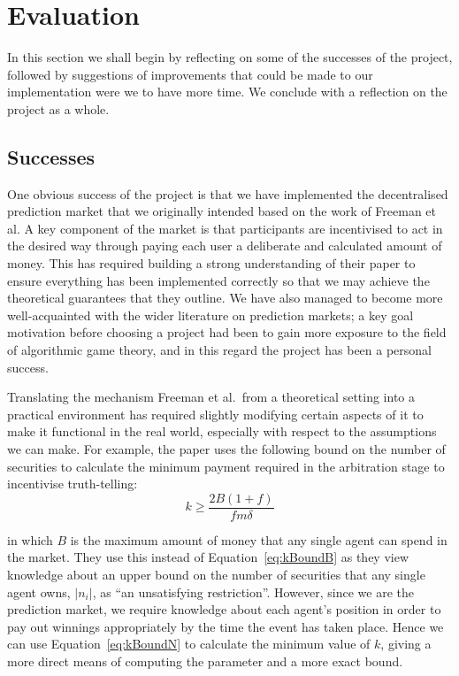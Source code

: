 \section{Evaluation}

\label{sec:evaluation}

In this section we shall begin by reflecting on some of the successes of the
project, followed by suggestions of improvements that could be made to our
implementation were we to have more time. We conclude with a reflection on the
project as a whole.

\subsection{Successes}

One obvious success of the project is that we have implemented the
decentralised prediction market that we originally intended based on the work
of Freeman et al. A key component of the market is that participants are
incentivised to act in the desired way through paying each user a deliberate
and calculated amount of money. This has required building a strong
understanding of their paper to ensure everything has been implemented
correctly so that we may achieve the theoretical guarantees that they outline.
We have also managed to become more well-acquainted with the wider literature
on prediction markets; a key goal motivation before choosing a project had been
to gain more exposure to the field of algorithmic game theory, and in this
regard the project has been a personal success.

Translating the mechanism Freeman et al.\ from a theoretical setting into a
practical environment has required slightly modifying certain aspects of it to
make it functional in the real world, especially with respect to the
assumptions we can make. For example, the paper uses the following bound on the
number of securities to calculate the minimum payment required in the
arbitration stage to incentivise truth-telling:
%
\begin{equation}
	\label{eq:kBoundB}
	k \ge \frac{2 B (1+f)}{f m \delta}
\end{equation}

in which $B$ is the maximum amount of money that any single agent can spend in
the market. They use this instead of Equation~\ref{eq:kBoundB} as they view
knowledge about an upper bound on the number of securities that any single
agent owns, $|n_i|$, as ``an unsatisfying restriction''. However, since we are
the prediction market, we require knowledge about each agent's position in
order to pay out winnings appropriately by the time the event has taken place.
Hence we can use Equation~\ref{eq:kBoundN} to calculate the minimum value of
$k$, giving a more direct means of computing the parameter and a more exact
bound.

